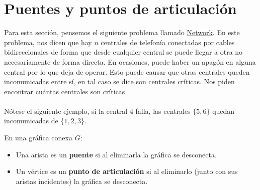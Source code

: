 \section{Puentes y puntos de articulación}
Para esta sección, pensemos el siguiente problema llamado \href{https://onlinejudge.org/external/3/315.pdf}{Network}. En este problema, nos dicen que hay $n$ centrales de telefonía conectadas por cables bidireccionales de forma que desde cualquier central se puede llegar a otra no necesariamente de forma directa. En ocasiones, puede haber un apagón en alguna central por lo que deja de operar. Esto puede causar que otras centrales queden incomunicadas entre sí, en tal caso se dice son centrales críticas. Nos piden encontrar cuántas centrales son críticas.
\\\\
Nótese el siguiente ejemplo, si la central $4$ falla, las centrales
  $\{5,6\}$ quedan incomunicadas de $\{1,2,3\}$.
 
\begin{figure}[H]
\centering
{}
\end{figure}
  
\begin{definition}
En una gráfica conexa $G$:
\begin{itemize}
    \item Una arista es un \textbf{puente} si al eliminarla la gráfica
          se desconecta.
    \item Un vértice es un \textbf{punto de articulación} si al
          eliminarlo (junto con sus aristas incidentes) la gráfica se
          desconecta.
\end{itemize}
\end{definition}

